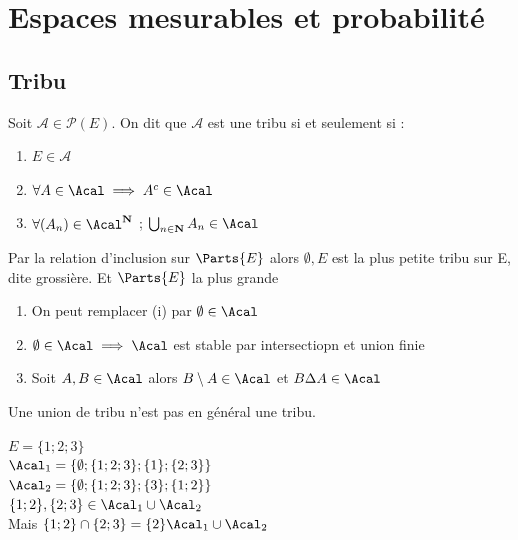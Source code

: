 \chapter{Espaces mesurables et probabilité}
\section{Tribu}

\begin{definition}[Tribu] 
    Soit $\mathcal{A} \in \mathcal{P}(E)$. On dit que $\mathcal{A}$ 
    est une tribu si et seulement si :

    \begin{enumerate}
        \item $E \in \mathcal{A}$
        \item $\forall A \in \Acal \implies A^{c} \in \Acal $
        \item $\forall (A_n) \in \Acal^\mathbf{N}$ ; $\bigcup_{n\in \mathbf{N}} A_n \in \Acal$
    \end{enumerate}

\end{definition}

\begin{remarque}
    Par la relation d'inclusion sur $\Parts{E}$ alors ${\emptyset,E}$ 
    est  la plus petite tribu sur E, dite grossière. Et $\Parts{E}$ la plus grande
\end{remarque}

\begin{propriété} 
    \begin{enumerate}
        \item  On peut remplacer (i) par $ \emptyset \in \Acal$
        \item $ \emptyset \in  \Acal \implies \Acal$ est stable par intersectiopn et union finie
        \item Soit $A,B \in \Acal$ alors $ B\setminus A \in \Acal$ et $ B \Delta A \in \Acal$
    \end{enumerate}
\end{propriété}

\begin{remarque}
    Une union de tribu n'est pas en général une tribu.
\end{remarque}

\begin{exemple}
$ E = \{1;2;3\}$ \\
$\Acal_1 = \{ \emptyset ; \{1;2;3\}; \{1\} ; \{2;3\} \}$ \\
$\Acal_2 = \{ \emptyset ; \{1;2;3\}; \{3\} ; \{1;2\} \}$ \\
$ \{1;2\} , \{2;3\} \in    \Acal_1 \cup \Acal_2 $ \\
Mais $ \{1;2\} \cap \{2;3\} = \{2\} \Acal_1 \cup \Acal_2$
\end{exemple}

